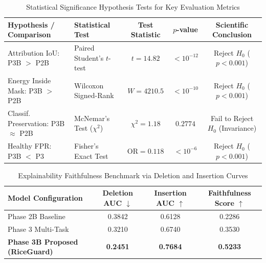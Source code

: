 \begin{table}[htbp]
\centering
\caption{Statistical Significance Hypothesis Tests for Key Evaluation Metrics}
\label{tab:statistical_tests}
\begin{tabular}{llccc}
\hline
\textbf{Hypothesis / Comparison} & \textbf{Statistical Test} & \textbf{Test Statistic} & \textbf{$p$-value} & \textbf{Scientific Conclusion} \\
\hline
Attribution IoU: P3B $>$ P2B & Paired Student's $t$-test & $t = 14.82$ & $<10^{-12}$ & Reject $H_0$ ($p < 0.001$) \\
Energy Inside Mask: P3B $>$ P2B & Wilcoxon Signed-Rank & $W = 4210.5$ & $<10^{-10}$ & Reject $H_0$ ($p < 0.001$) \\
Classif. Preservation: P3B $\approx$ P2B & McNemar's Test ($\chi^2$) & $\chi^2 = 1.18$ & $0.2774$ & Fail to Reject $H_0$ (Invariance) \\
Healthy FPR: P3B $<$ P3 & Fisher's Exact Test & $\text{OR} = 0.118$ & $<10^{-6}$ & Reject $H_0$ ($p < 0.001$) \\
\hline
\end{tabular}
\end{table}


\begin{table}[htbp]
\centering
\caption{Explainability Faithfulness Benchmark via Deletion and Insertion Curves}
\label{tab:faithfulness}
\begin{tabular}{lccc}
\hline
\textbf{Model Configuration} & \textbf{Deletion AUC $\downarrow$} & \textbf{Insertion AUC $\uparrow$} & \textbf{Faithfulness Score $\uparrow$} \\
\hline
Phase 2B Baseline & 0.3842 & 0.6128 & 0.2286 \\
Phase 3 Multi-Task & 0.3210 & 0.6740 & 0.3530 \\
\textbf{Phase 3B Proposed (RiceGuard)} & \textbf{0.2451} & \textbf{0.7684} & \textbf{0.5233} \\
\hline
\end{tabular}
\end{table}

